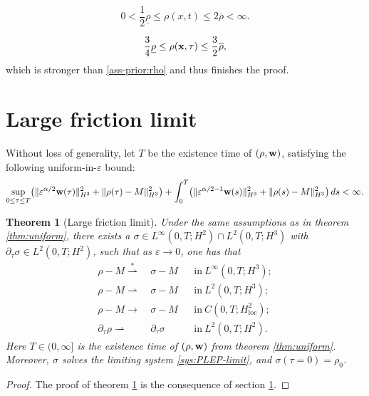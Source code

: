 \documentclass[10pt,a4paper]{amsart}
\newtheorem{theorem}{Theorem}
\newcommand{\dtau}{\partial_\tau}
\newcommand{\mrm}[1]{\mathrm{#1}}
\newcommand{\norm}[2]{\Vert #1 \Vert_{#2}}
\renewcommand{\vec}[1]{{\bf #1}}
\begin{document}
\begin{equation}
    \label{ass-prior:rho}
    0 < \frac{1}{2} \underline{\rho} \leq \rho(x,t) \leq 2 \overline \rho  < \infty. 
\end{equation}

\begin{equation}
    \label{ene:708}
    \frac{3}{4} \underline \rho \leq \rho(\vec x, \tau) \leq \frac{3}{2} \overline \rho, 
\end{equation}
which is stronger than \eqref{ass-prior:rho} and thus finishes the proof. 


\section{Large friction limit}
\label{sec:convergence}

Without loss of generality, let $ T $ be the existence time of $ (\rho, \vec w) $, satisfying the following uniform-in-$\varepsilon $ bound:
\begin{equation}
    \label{ene:801}
    \begin{aligned}
        \sup_{0\leq \tau \leq T} \bigl( \norm{\varepsilon^{\alpha/2} \vec w(\tau)}{H^3}^2 + \norm{\rho(\tau)-M}{H^3}^2 \bigr) + \int_0^T \bigl( \norm{\varepsilon^{\alpha/2-1}\vec w(s)}{H^3}^2 + \norm{\rho(s)-M}{H^3}^2 \bigr) \,ds < \infty. 
    \end{aligned}
\end{equation}

\begin{theorem}[Large friction limit]
    \label{thm:limit}
    Under the same assumptions as in theorem \ref{thm:uniform}, there exists a $ \sigma \in L^\infty(0,T;H^2)\cap L^2(0,T;H^3) $ with $ \dtau \sigma \in L^2(0,T;H^2) $, such that as $ \varepsilon \rightarrow 0 $, one has that 
\begin{align}
    \label{thm:limit-1}
    \rho - M  \stackrel{*}{\rightharpoonup} & ~ \sigma - M && \text{in} ~ L^\infty(0,T;H^3);\\
    \label{thm:limit-2}
    \rho - M {\rightharpoonup} & ~ \sigma - M && \text{in} ~ L^2(0,T;H^3); \\
    \label{thm:limit-3}
    \rho - M \rightarrow & ~ \sigma - M && \text{in} ~ C(0,T;H^2_\mrm{loc}); \\
    \label{thm:limit-4}
    \dtau \rho \rightharpoonup & ~ \dtau \sigma && \text{in} ~ L^2(0,T;H^2).
\end{align}
Here $ T \in (0,\infty] $ is the existence time of $ (\rho,\vec w) $ from theorem \ref{thm:uniform}. Moreover, $ \sigma $ solves the limiting system \eqref{sys:PLEP-limit}, and $ \sigma(\tau = 0) = \rho_0 $. 
    
\end{theorem}

\begin{proof}
    The proof of theorem \ref{thm:limit} is the consequence of section \ref{sec:convergence}.
\end{proof}
\end{document}
